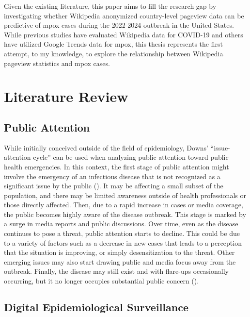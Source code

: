 \documentclass[
  12pt,
]{article}
\begin{document}
Given the existing literature, this paper aims to fill the research gap
by investigating whether Wikipedia anonymized country-level pageview
data can be predictive of mpox cases during the 2022-2024 outbreak in
the United States. While previous studies have evaluated Wikipedia data
for COVID-19 and others have utilized Google Trends data for mpox, this
thesis represents the first attempt, to my knowledge, to explore the
relationship between Wikipedia pageview statistics and mpox cases.

\section{Literature Review}\label{literature-review}

\subsection{Public Attention}\label{public-attention}

While initially conceived outside of the field of epidemiology, Downs'
``issue-attention cycle'' can be used when analyzing public attention
toward public health emergencies. In this context, the first stage of
public attention might involve the emergency of an infectious disease
that is not recognized as a significant issue by the public
(). It may be affecting a small subset
of the population, and there may be limited awareness outside of health
professionals or those directly affected. Then, due to a rapid increase
in cases or media coverage, the public becomes highly aware of the
disease outbreak. This stage is marked by a surge in media reports and
public discussions. Over time, even as the disease continues to pose a
threat, public attention starts to decline. This could be due to a
variety of factors such as a decrease in new cases that leads to a
perception that the situation is improving, or simply desensitization to
the threat. Other emerging issues may also start drawing public and
media focus away from the outbreak. Finally, the disease may still exist
and with flare-ups occasionally occurring, but it no longer occupies
substantial public concern ().

\subsection{Digital Epidemiological
Surveillance}\label{digital-epidemiological-surveillance}
\end{document}
